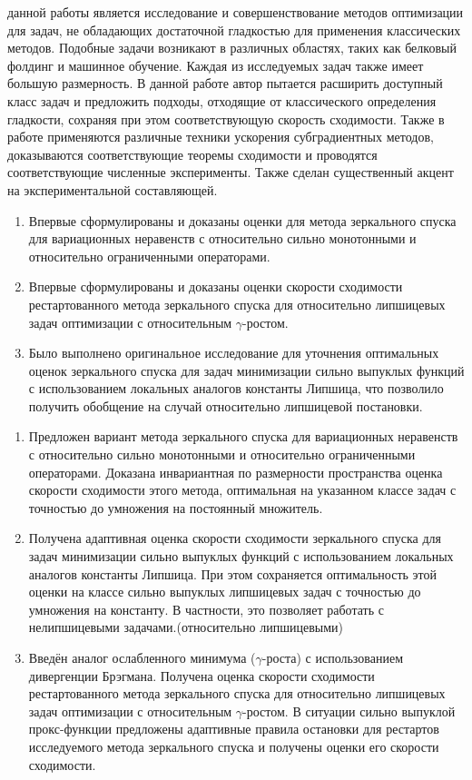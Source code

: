 {\aim} данной работы является исследование и совершенствование методов оптимизации для задач, не обладающих достаточной гладкостью для применения классических методов. Подобные задачи возникают в различных областях, таких как белковый фолдинг и машинное обучение. Каждая из исследуемых задач также имеет большую размерность. В данной работе автор пытается расширить доступный класс задач и предложить подходы, отходящие от классического определения гладкости, сохраняя при этом соответствующую скорость сходимости. Также в работе применяются различные техники ускорения субградиентных методов, доказываются соответствующие теоремы сходимости и проводятся соответствующие численные эксперименты. Также сделан существенный акцент на экспериментальной составляющей. 

{\novelty}
\begin{enumerate}[beginpenalty=10000] %
  \item Впервые сформулированы и доказаны оценки для метода зеркального спуска для вариационных неравенств с относительно сильно монотонными и относительно ограниченными операторами.
  \item Впервые сформулированы и доказаны оценки скорости сходимости рестартованного метода зеркального спуска для относительно липшицевых задач оптимизации с относительным $\gamma$-ростом.
  \item Было выполнено оригинальное исследование для уточнения оптимальных оценок зеркального спуска для задач минимизации сильно выпуклых функций с использованием локальных аналогов константы Липшица, что позволило получить обобщение на случай относительно липшицевой постановки. 
\end{enumerate}

{}
\begin{enumerate}[beginpenalty=10000] %
  \item Предложен вариант метода зеркального спуска для вариационных неравенств с относительно сильно монотонными и относительно ограниченными операторами. Доказана инвариантная по размерности пространства оценка скорости сходимости этого метода, оптимальная на указанном классе задач с точностью до умножения на постоянный множитель.
  \item Получена адаптивная оценка скорости сходимости зеркального спуска для задач минимизации сильно выпуклых функций с использованием локальных аналогов константы Липшица. При этом сохраняется оптимальность этой оценки на классе сильно выпуклых липшицевых задач с точностью до умножения на константу. В частности, это позволяет работать с нелипшицевыми задачами.(относительно липшицевыми)
  \item Введён аналог ослабленного минимума ($\gamma$-роста) с использованием дивергенции Брэгмана. Получена оценка скорости сходимости рестартованного метода зеркального спуска для относительно липшицевых задач оптимизации с относительным $\gamma$-ростом. В ситуации сильно выпуклой прокс-функции предложены адаптивные правила остановки для рестартов исследуемого метода зеркального спуска и получены оценки его скорости сходимости.
\end{enumerate}

